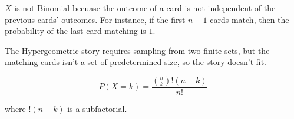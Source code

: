$X$ is not Binomial becuase the outcome of a card is not independent of the
previous cards' outcomes. For instance, if the first $n-1$ cards match, then the
probability of the last card matching is $1$.

The Hypergeometric story requires sampling from two finite sets, but
the matching cards isn't a set of predetermined size, so the story doesn't fit.

$$P(X = k) = \frac{\binom{n}{k}!(n-k)}{n!}$$

where $!(n-k)$ is a subfactorial.